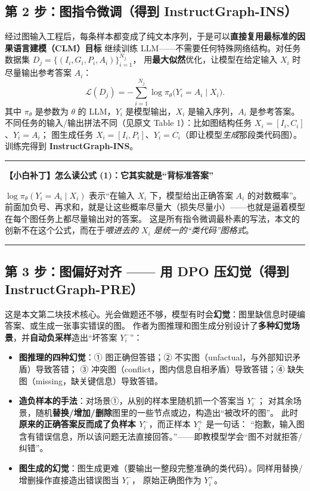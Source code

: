 \documentclass[11pt,UTF8,fontset=fandol]{ctexart}
\newenvironment{tip}[1]{%
  \par\smallskip\noindent\rule{\linewidth}{0.4pt}\par\nobreak
  \noindent\textbf{【小白补丁】#1}\par\nobreak\noindent\ignorespaces
}{%
  \par\noindent\rule{\linewidth}{0.4pt}\par\smallskip
}
\begin{document}
\subsection{第 2 步：图指令微调（得到 InstructGraph-INS）}
经过图输入工程后，每条样本都变成了纯文本序列，于是可以\textbf{直接复用最标准的因果语言建模（CLM）目标}
继续训练 LLM——不需要任何特殊网络结构。对任务数据集 $D_j=\{(I_i,G_i,P_i,A_i)\}_{i=1}^{N_j}$，
用\textbf{最大似然}优化，让模型在给定输入 $X_i$ 时尽量输出参考答案 $A_i$：
\begin{equation*}
  \mathcal{L}(D_j) = -\sum_{i=1}^{N_j} \log \pi_\theta\big(Y_i = A_i \mid X_i\big). \tag{1}
\end{equation*}
其中 $\pi_\theta$ 是参数为 $\theta$ 的 LLM，$Y_i$ 是模型输出，$X_i$ 是输入序列，$A_i$ 是参考答案。
不同任务的输入/输出拼法不同（见原文 Table 1）：比如图结构任务 $X_i=[I_i,C_i]$、$Y_i=A_i$；
图生成任务 $X_i=[I_i,P_i]$、\textbf{$Y_i=C_i$}（即让模型\emph{生成}那段类代码图）。训练完得到 \textbf{InstructGraph-INS}。

\begin{tip}{怎么读公式 (1)：它其实就是“背标准答案”}
$\log\pi_\theta(Y_i=A_i\mid X_i)$ 表示“在输入 $X_i$ 下，模型给出正确答案 $A_i$ 的对数概率”。
前面加负号、再求和，就是让这些概率尽量大（损失尽量小）——也就是逼着模型在每个图任务上都尽量输出对的答案。
这是所有指令微调最朴素的写法，本文的创新不在这个公式，而在于\emph{喂进去的 $X_i$ 是统一的“类代码”图格式}。
\end{tip}

\subsection{第 3 步：图偏好对齐 —— 用 DPO 压幻觉（得到 InstructGraph-PRE）}
这是本文第二块技术核心。光会做题还不够，模型有时会\textbf{幻觉}：图里缺信息时硬编答案、或生成一张事实错误的图。
作者为图推理和图生成分别设计了\textbf{多种幻觉场景}，并\textbf{自动负采样}造出“坏答案 $Y_i^-$”：

\begin{itemize}[leftmargin=2em]
  \item \textbf{图推理的四种幻觉}：① 图正确但答错；② 不实图（unfactual，与外部知识矛盾）导致答错；
        ③ 冲突图（conflict，图内信息自相矛盾）导致答错；④ 缺失图（missing，缺关键信息）导致答错。
  \item \textbf{造负样本的手法}：对场景①，从别的样本里随机抓一个答案当 $Y_i^-$；
        对其余场景，随机\textbf{替换/增加/删除}图里的一些节点或边，构造出“被改坏的图”。
        此时\textbf{原来的正确答案反而成了负样本 $Y_i^-$}，而正样本 $Y_i^+$ 是一句话：
        “抱歉，输入图含有错误信息，所以该问题无法直接回答。”——即教模型学会“图不对就拒答/纠错”。
  \item \textbf{图生成的幻觉}：图生成更难（要输出一整段完整准确的类代码）。同样用替换/增删操作直接造出错误图当 $Y_i^-$，
        原始正确图作为 $Y_i^+$。
\end{itemize}
\end{document}
